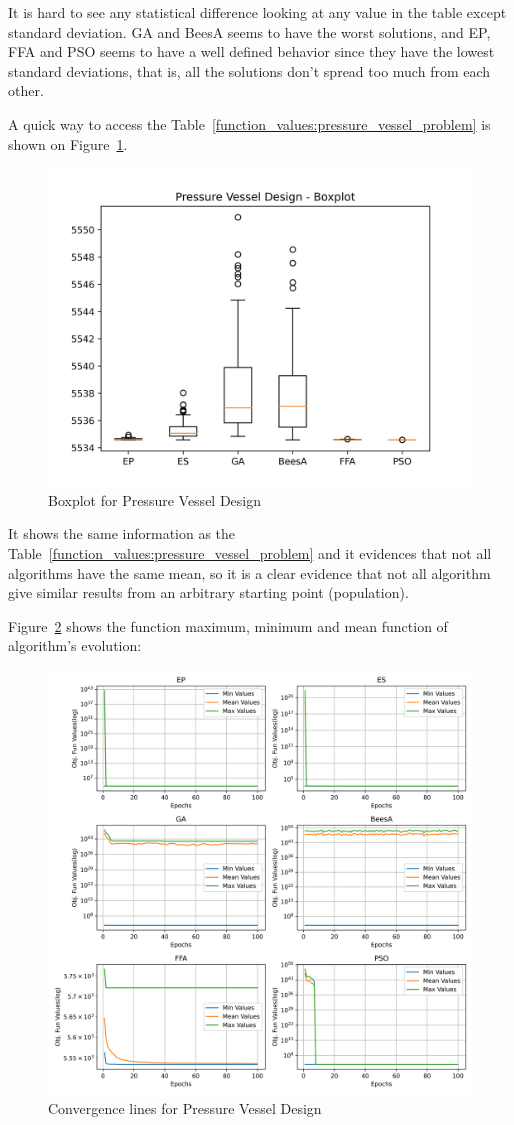\documentclass[conference]{IEEEtran}
\begin{document}
It is hard to see any statistical  difference looking at any value in the table except standard deviation.
GA and BeesA seems to have the worst solutions, and EP, FFA and PSO seems to have a well defined behavior
since they have the lowest standard deviations, that is, all the solutions don't spread too much from each
other.


A quick way to access the Table~\ref{function_values:pressure_vessel_problem} is shown on Figure~\ref{fig:pressure_vessel_design_boxplot}.

\begin{figure}[H]
\centering
\caption{Boxplot for Pressure Vessel Design}
\label{fig:pressure_vessel_design_boxplot}
\includegraphics[scale=0.5]{images/pressure_vessel_problem_boxplot.png}
\end{figure}

It shows the same information as the Table~\ref{function_values:pressure_vessel_problem}
and it evidences that not all algorithms have the same mean, so it is a clear evidence
that not all algorithm give similar results from an arbitrary starting point (population).



Figure~\ref{fig:pressure_vessel_problem_convergence} shows the
function maximum, minimum and mean function of algorithm's evolution:

\begin{figure}[H]
\centering
\caption{Convergence lines for Pressure Vessel Design}
\label{fig:pressure_vessel_problem_convergence}
\includegraphics[width=0.4 \textwidth]{images/pressure_vessel_problem_convergence.png}
\end{figure}
\end{document}
